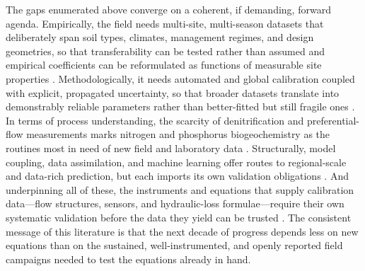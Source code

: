 \documentclass[11pt]{article}
\begin{document}
The gaps enumerated above converge on a coherent, if demanding, forward agenda. Empirically, the field needs multi-site, multi-season datasets that deliberately span soil types, climates, management regimes, and design geometries, so that transferability can be tested rather than assumed and empirical coefficients can be reformulated as functions of measurable site properties \parencite{Li2006,Chelil2022}. Methodologically, it needs automated and global calibration coupled with explicit, propagated uncertainty, so that broader datasets translate into demonstrably reliable parameters rather than better-fitted but still fragile ones \parencite{Warsta2014,Timalsina2023,Alzraiee2013b}. In terms of process understanding, the scarcity of denitrification and preferential-flow measurements marks nitrogen and phosphorus biogeochemistry as the routines most in need of new field and laboratory data \parencite{David2009,Salazar2011}. Structurally, model coupling, data assimilation, and machine learning offer routes to regional-scale and data-rich prediction, but each imports its own validation obligations \parencite{Apostel2021,Song2021}. And underpinning all of these, the instruments and equations that supply calibration data---flow structures, sensors, and hydraulic-loss formulae---require their own systematic validation before the data they yield can be trusted \parencite{Christianson2019,Bayat2011}. The consistent message of this literature is that the next decade of progress depends less on new equations than on the sustained, well-instrumented, and openly reported field campaigns needed to test the equations already in hand.

\printbibliography
\end{document}
